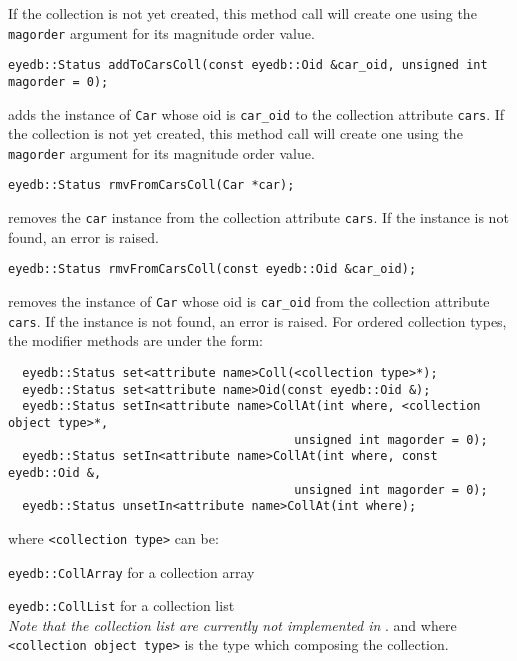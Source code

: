 If the collection is not yet created, this method call will create one
using the \texttt{magorder} argument for its magnitude order value.
\item
\verbsize
\begin{verbatim}
eyedb::Status addToCarsColl(const eyedb::Oid &car_oid, unsigned int magorder = 0);
\end{verbatim}
\normalsize
adds the instance of \texttt{Car} whose oid is \texttt{car\_oid}
to the collection attribute \texttt{cars}.
If the collection is not yet created, this method call will create one
using the \texttt{magorder} argument for its magnitude order value.
\item
\verbsize
\begin{verbatim}
eyedb::Status rmvFromCarsColl(Car *car);
\end{verbatim}
\normalsize
removes the \texttt{car} instance from the collection attribute \texttt{cars}.
If the instance is not found, an error is raised.
\item
\verbsize
\begin{verbatim}
eyedb::Status rmvFromCarsColl(const eyedb::Oid &car_oid);
\end{verbatim}
\normalsize
removes the instance of \texttt{Car} whose oid is \texttt{car\_oid}
from the collection attribute \texttt{cars}.
If the instance is not found, an error is raised.
\ee
For ordered collection types, the modifier methods are under the form:
\verbsize
\begin{verbatim}
  eyedb::Status set<attribute name>Coll(<collection type>*);
  eyedb::Status set<attribute name>Oid(const eyedb::Oid &);
  eyedb::Status setIn<attribute name>CollAt(int where, <collection object type>*,
                                        unsigned int magorder = 0);
  eyedb::Status setIn<attribute name>CollAt(int where, const eyedb::Oid &,
                                        unsigned int magorder = 0);
  eyedb::Status unsetIn<attribute name>CollAt(int where);
\end{verbatim}
\normalsize
where \texttt{<collection type>} can be:
\be
\item \texttt{eyedb::CollArray} for a collection array
\item \texttt{eyedb::CollList} for a collection list\\
\emph{Note that the collection list are currently not implemented in
\eyedb}.
\ee
and where \texttt{<collection object type>} is the type which composing
the collection.
\\
\\
